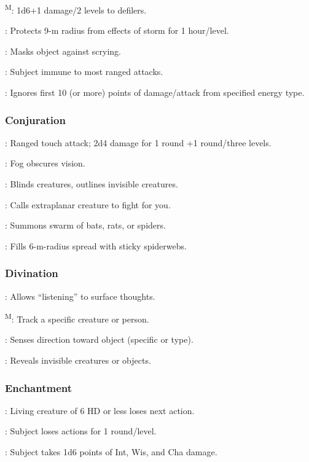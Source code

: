 	\textsuperscript{M}: 1d6+1 damage/2 levels to defilers. %

	: Protects 9-m radius from effects of storm for 1 hour/level.%

	: Masks object against scrying.

	: Subject immune to most ranged attacks.

	: Ignores first 10 (or more) points of damage/attack from specified energy type.

\subsubsection{Conjuration}
	: Ranged touch attack; 2d4 damage for 1 round +1 round/three levels.

	: Fog obscures vision.

	: Blinds creatures, outlines invisible creatures.

	: Calls extraplanar creature to fight for you.

	: Summons swarm of bats, rats, or spiders.

	: Fills 6-m-radius spread with sticky spiderwebs.

\subsubsection{Divination}
	: Allows ``listening'' to surface thoughts.

	\textsuperscript{M}: Track a specific creature or person. %

	: Senses direction toward object (specific or type).

	: Reveals invisible creatures or objects.

\subsubsection{Enchantment}
	: Living creature of 6 HD or less loses next action.

	: Subject loses actions for 1 round/level.

	: Subject takes 1d6 points of Int, Wis, and Cha damage.

